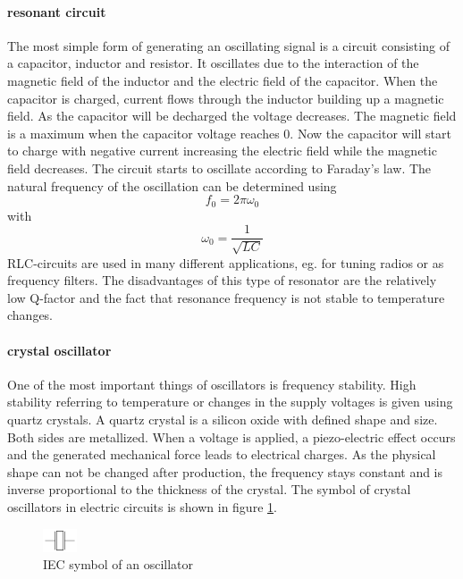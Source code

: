 \paragraph{resonant circuit\\}
The most simple form of generating an oscillating signal is a circuit consisting of a capacitor, inductor and resistor. It oscillates due to the interaction of the magnetic field of the inductor and the electric field of the capacitor. When the capacitor is charged, current flows through the inductor building up a magnetic field. As the capacitor will be decharged the voltage decreases. The magnetic field is a maximum when the capacitor voltage reaches 0. Now the capacitor will start to charge with negative current increasing the electric field while the magnetic field decreases. The circuit starts to oscillate according to Faraday's law. The natural frequency of the oscillation can be determined using
\begin{equation}
f_0=2\pi\omega_0
\end{equation}
with
\begin{equation}
\omega_0=\frac{1}{\sqrt{LC}}
\end{equation}
RLC-circuits are used in many different applications, eg. for tuning radios or as frequency filters. The disadvantages of this type of resonator are the relatively low Q-factor and the fact that resonance frequency is not stable to temperature changes.
\paragraph{crystal oscillator\\}
One of the most important things of oscillators is frequency stability. High stability referring to temperature or changes in the supply voltages is given using quartz crystals. A quartz crystal is a silicon oxide with defined shape and size. Both sides are metallized. When a voltage is applied, a piezo-electric effect occurs and the generated mechanical force leads to electrical charges. As the physical shape can not be changed after production, the frequency stays constant and is inverse proportional to the thickness of the crystal. The symbol of crystal oscillators in electric circuits is shown in figure \ref{fig:crystaloscillatorsymbol}.
\begin{figure}[htbp]
\begin{center}
\includegraphics[width=1cm,keepaspectratio=true]{bilder/png/crystaloscillatorsymbol}
\caption{IEC symbol of an oscillator}
\label{fig:crystaloscillatorsymbol}
\end{center}
\end{figure}

